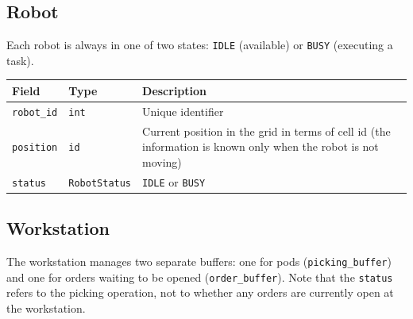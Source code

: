 \documentclass[a4paper,10pt]{article}
\begin{document}
\subsection{Robot}

Each robot is always in one of two states: \texttt{IDLE} (available) or \texttt{BUSY} (executing a task). 

\vspace{0.4em}
\begin{tabularx}{\textwidth}{l l X}
\toprule
\textbf{Field} & \textbf{Type} & \textbf{Description} \\
\midrule
\texttt{robot\_id}         & \texttt{int}            & Unique identifier \\
\texttt{position}          & \texttt{id}             & Current position in the grid in terms of cell id (the information is known only when the robot is not moving)\\
\texttt{status}            & \texttt{RobotStatus}    & \texttt{IDLE} or \texttt{BUSY} \\
\bottomrule
\end{tabularx}

\subsection{Workstation}

The workstation manages two separate buffers: one for pods (\texttt{picking\_buffer}) and one for orders waiting to be opened (\texttt{order\_buffer}). Note that the \texttt{status} refers to the picking operation, not to whether any orders are currently open at the workstation.
\end{document}
